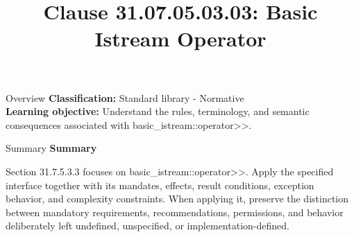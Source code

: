 \documentclass[10pt,letterpaper]{article}
\title{Clause 31.07.05.03.03: Basic Istream Operator}
\author{}
\date{}
\begin{document}
\maketitle
\begin{CornellOverviewBox}{Overview}
\textbf{Classification:} Standard library - Normative\\[2pt]
\textbf{Learning objective:} Understand the rules, terminology, and semantic consequences associated with basic\_istream::operator>>.
\end{CornellOverviewBox}\begin{CornellSummaryBox}{Summary}
{\sffamily\bfseries\color{Accent} Summary}\par\vspace{3pt}Section 31.7.5.3.3 focuses on basic\_istream::operator>>. Apply the specified interface together with its mandates, effects, result conditions, exception behavior, and complexity constraints. When applying it, preserve the distinction between mandatory requirements, recommendations, permissions, and behavior deliberately left undefined, unspecified, or implementation-defined.
\end{CornellSummaryBox}
\end{document}
